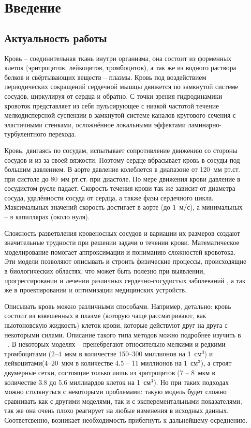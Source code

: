 \section{Введение}
\subsection{Актуальность работы}

Кровь -- соединительная ткань внутри организма, она состоит из форменных клеток (эритроцитов, лейкоцитов, тромбоцитов), а так же из
водного раствора белков и свёртывающих веществ -- плазмы. Кровь под воздействием периодических сокращений сердечной мышцы 
движется по замкнутой системе сосудов, циркулируя от сердца и обратно. С точки зрения гидродинамики кровоток представляет 
из себя пульсирующее с низкой частотой течение мелкодисперсной суспензии в 
замкнутой системе каналов кругового сечения с эластичными стенками, осложнённое локальными эффектами ламинарно-турбулентного перехода.

Кровь, двигаясь по сосудам, испытывает сопротивление движению со стороны сосудов и из-за своей вязкости. Поэтому сердце вбрасывает 
кровь в сосуды под большим давлением. В аорте давление колеблется в диапазоне от 120~мм рт.ст. при систоле до 80~мм рт.ст. при диастоле. 
По мере движения крови давление в сосудистом русле падает. 
Скорость течения крови так же зависит от диаметра сосуда, удалённости сосуда от сердца, а также фазы сердечного цикла. 
Максимальных значений скорость достигает в аорте (до \texttilde$1$~м/с), а минимальных -- в капиллярах (около нуля).

Сложность разветвления кровеносных сосудов и вариации их размеров создают значительные трудности при решении задачи о течении крови. 
Математическое моделирование помогает  
аппроксимации и пониманию сложностей кровотока. Эти модели позволяют описывать и строить физические процессы, происходящие 
в биологических областях, что может быть полезно при выявлении, прогрессировании и лечении  различных сердечно-сосудистых заболеваний , 
а так же в проектировании и оптимизации медицинских устройств.

Описывать кровь можно различными способами. Например, детально: кровь состоит из взвешенных в плазме 
(которую чаще рассматривают, как ньютоновскую жидкость) клеток крови, которые действуют друг на друга с некоторыми силами. 
Описание такого типа методов можно подробнее изучить в ~\cite{Fedosov:2010,Fedosov:2008,Mehboudi:2001}. 
В некоторых моделях ~\cite{bessonov:2014,hosseini:2009} пренебрегают относительно мелкими и редкими -- тромбоцитами
(2--4~мкм в количестве 150--300 миллионов на 1~см$^3$) и лейкоцитами(4--20~мкм в количестве 4.5 -- 11 миллионов на 1~см$^3$), 
а строят двумерные сетки, состоящие только лишь из эритроцитов (7 -- 8~мкм в количестве 3.8 до 5.6 миллиардов клеток на 1~см$^3$).
Но при таких подходах можно столкнуться с некоторыми проблемами: такую модель будет сложно сравнивать как
с другими моделями, так и с эксперементальными показателями, так же она очень плохо реагирует на любые изменения в исходных данных. 
Соответсвенно, возникает необходимость прибегнуть к дальнейшему осреднению.

